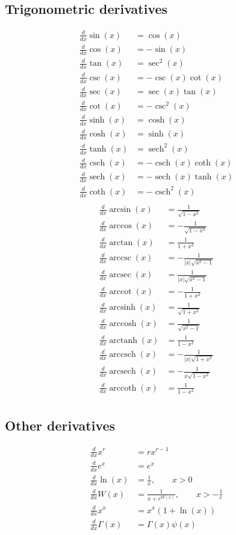 \documentclass{article}
\DeclareMathOperator{\csch}{csch}
\DeclareMathOperator{\sech}{sech}
\DeclareMathOperator{\arccsc}{arccsc}
\DeclareMathOperator{\arcsec}{arcsec}
\DeclareMathOperator{\arccot}{arccot}
\DeclareMathOperator{\arcsinh}{arcsinh}
\DeclareMathOperator{\arccosh}{arccosh}
\DeclareMathOperator{\arctanh}{arctanh}
\DeclareMathOperator{\arccsch}{arccsch}
\DeclareMathOperator{\arcsech}{arcsech}
\DeclareMathOperator{\arccoth}{arccoth}
\begin{document}
\subsection{Trigonometric derivatives}
\begin{align}
\frac{d}{dx}\sin(x)&=\cos(x)\\
\frac{d}{dx}\cos(x)&=-\sin(x)\\
\frac{d}{dx}\tan(x)&=\sec^2(x)\\
\frac{d}{dx}\csc(x)&=-\csc(x)\cot(x)\\
\frac{d}{dx}\sec(x)&=\sec(x)\tan(x)\\
\frac{d}{dx}\cot(x)&=-\csc^2(x)\\
\frac{d}{dx}\sinh(x)&=\cosh(x)\\
\frac{d}{dx}\cosh(x)&=\sinh(x)\\
\frac{d}{dx}\tanh(x)&=\sech^2(x)\\
\frac{d}{dx}\csch(x)&=-\csch(x)\coth(x)\\
\frac{d}{dx}\sech(x)&=-\sech(x)\tanh(x)\\
\frac{d}{dx}\coth(x)&=-\csch^2(x)\\
\end{align}
\begin{align}
\frac{d}{dx}\arcsin(x)&=\frac{1}{\sqrt{1-x^2}}\\
\frac{d}{dx}\arccos(x)&=-\frac{1}{\sqrt{1-x^2}}\\
\frac{d}{dx}\arctan(x)&=\frac{1}{1+x^2}\\
\frac{d}{dx}\arccsc(x)&=-\frac{1}{|x|\sqrt{x^2-1}}\\
\frac{d}{dx}\arcsec(x)&=\frac{1}{|x|\sqrt{x^2-1}}\\
\frac{d}{dx}\arccot(x)&=-\frac{1}{1+x^2}\\
\frac{d}{dx}\arcsinh(x)&=\frac{1}{\sqrt{1+x^2}}\\
\frac{d}{dx}\arccosh(x)&=\frac{1}{\sqrt{x^2-1}}\\
\frac{d}{dx}\arctanh(x)&=\frac{1}{1-x^2}\\
\frac{d}{dx}\arccsch(x)&=-\frac{1}{|x|\sqrt{1+x^2}}\\
\frac{d}{dx}\arcsech(x)&=-\frac{1}{x\sqrt{1-x^2}}\\
\frac{d}{dx}\arccoth(x)&=\frac{1}{1-x^2}\\
\end{align}

\subsection{Other derivatives}
\begin{align}
\frac{d}{dx}x^r&=rx^{r-1}\\
\frac{d}{dx}e^x&=e^x\\
\frac{d}{dx}\ln(x)&=\frac{1}{x},\qquad{}x>0\\
\frac{d}{dx}W(x)&=\frac{1}{x+e^{W(x)}},\qquad{}x>-\frac{1}{e}\\
\frac{d}{dx}x^x&=x^x(1+\ln(x))\\
\frac{d}{dx}\Gamma(x)&=\Gamma(x)\psi(x)
\end{align}
\end{document}
